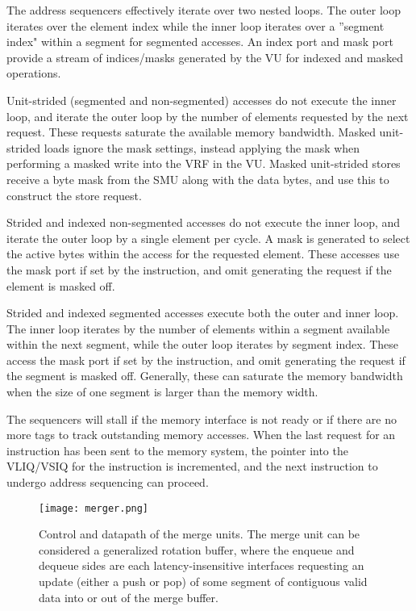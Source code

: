 The address sequencers effectively iterate over two nested loops.
The outer loop iterates over the element index while the inner loop iterates over a ''segment index" within a segment for segmented accesses.
An index port and mask port provide a stream of indices/masks generated by the VU for indexed and masked operations.

Unit-strided (segmented and non-segmented) accesses do not execute the inner loop, and iterate the outer loop by the number of elements requested by the next request.
These requests saturate the available memory bandwidth.
Masked unit-strided loads ignore the mask settings, instead applying the mask when performing a masked write into the VRF in the VU.
Masked unit-strided stores receive a byte mask from the SMU along with the data bytes, and use this to construct the store request.

Strided and indexed non-segmented accesses do not execute the inner loop, and iterate the outer loop by a single element per cycle.
A mask is generated to select the active bytes within the access for the requested element.
These accesses use the mask port if set by the instruction, and omit generating the request if the element is masked off.

Strided and indexed segmented accesses execute both the outer and inner loop.
The inner loop iterates by the number of elements within a segment available within the next segment, while the outer loop iterates by segment index.
These access the mask port if set by the instruction, and omit generating the request if the segment is masked off.
Generally, these can saturate the memory bandwidth when the size of one segment is larger than the memory width.

The sequencers will stall if the memory interface is not ready or if there are no more tags to track outstanding memory accesses.
When the last request for an instruction has been sent to the memory system, the pointer into the VLIQ/VSIQ for the instruction is incremented, and the next instruction to undergo address sequencing can proceed.

\newpage
\begin{figure}[hbtp]
  \centering
  \texttt{[image: merger.png]}
  \caption{Control and datapath of the merge units. The merge unit can be considered a generalized rotation buffer, where the enqueue and dequeue sides are each latency-insensitive interfaces requesting an update (either a push or pop) of some segment of contiguous valid data into or out of the merge buffer.}
  \label{fig:merge}
\end{figure}

